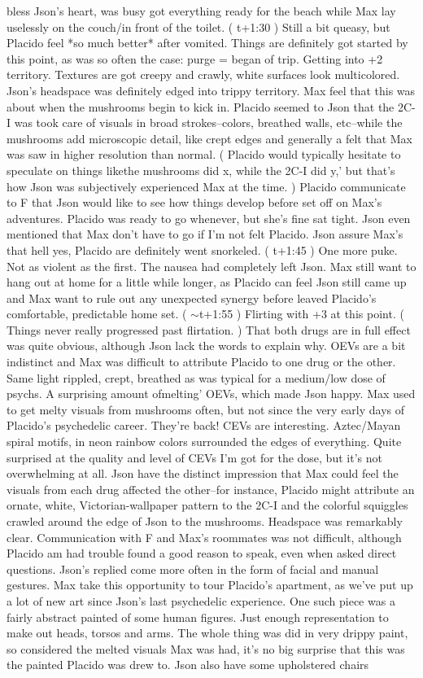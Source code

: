 \documentclass[12pt]{book}
\begin{document}
bless Json's heart, was busy got everything ready for the beach while Max lay uselessly on the couch/in front of the toilet. ( t+1:30 ) Still a bit queasy, but Placido feel *so much better* after vomited. Things are definitely got started by this point, as was so often the case: purge = began of trip. Getting into +2 territory. Textures are got creepy and crawly, white surfaces look multicolored. Json's headspace was definitely edged into trippy territory. Max feel that this was about when the mushrooms begin to kick in. Placido seemed to Json that the 2C-I was took care of visuals in broad strokes--colors, breathed walls, etc--while the mushrooms add microscopic detail, like crept edges and generally a felt that Max was saw in higher resolution than normal. ( Placido would typically hesitate to speculate on things likethe mushrooms did x, while the 2C-I did y,' but that's how Json was subjectively experienced Max at the time. ) Placido communicate to F that Json would like to see how things develop before set off on Max's adventures. Placido was ready to go whenever, but she's fine sat tight. Json even mentioned that Max don't have to go if I'm not felt Placido. Json assure Max's that hell yes, Placido are definitely went snorkeled. ( t+1:45 ) One more puke. Not as violent as the first. The nausea had completely left Json. Max still want to hang out at home for a little while longer, as Placido can feel Json still came up and Max want to rule out any unexpected synergy before leaved Placido's comfortable, predictable home set. ( $\sim$t+1:55 ) Flirting with +3 at this point. ( Things never really progressed past flirtation. ) That both drugs are in full effect was quite obvious, although Json lack the words to explain why. OEVs are a bit indistinct and Max was difficult to attribute Placido to one drug or the other. Same light rippled, crept, breathed as was typical for a medium/low dose of psychs. A surprising amount ofmelting' OEVs, which made Json happy. Max used to get melty visuals from mushrooms often, but not since the very early days of Placido's psychedelic career. They're back! CEVs are interesting. Aztec/Mayan spiral motifs, in neon rainbow colors surrounded the edges of everything. Quite surprised at the quality and level of CEVs I'm got for the dose, but it's not overwhelming at all. Json have the distinct impression that Max could feel the visuals from each drug affected the other--for instance, Placido might attribute an ornate, white, Victorian-wallpaper pattern to the 2C-I and the colorful squiggles crawled around the edge of Json to the mushrooms. Headspace was remarkably clear. Communication with F and Max's roommates was not difficult, although Placido am had trouble found a good reason to speak, even when asked direct questions. Json's replied come more often in the form of facial and manual gestures. Max take this opportunity to tour Placido's apartment, as we've put up a lot of new art since Json's last psychedelic experience. One such piece was a fairly abstract painted of some human figures. Just enough representation to make out heads, torsos and arms. The whole thing was did in very drippy paint, so considered the melted visuals Max was had, it's no big surprise that this was the painted Placido was drew to. Json also have some upholstered chairs 
\end{document}
